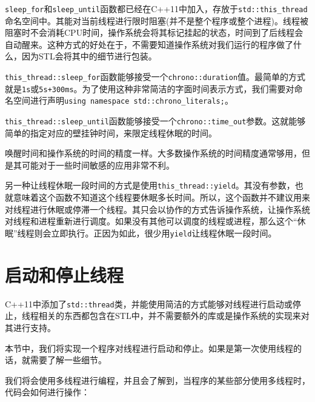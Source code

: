 \texttt{sleep\_for}和\texttt{sleep\_until}函数都已经在C++11中加入，存放于\texttt{std::this\_thread}命名空间中。其能对当前线程进行限时阻塞(并不是整个程序或整个进程)。线程被阻塞时不会消耗CPU时间，操作系统会将其标记挂起的状态，时间到了后线程会自动醒来。这种方式的好处在于，不需要知道操作系统对我们运行的程序做了什么，因为STL会将其中的细节进行包装。

\texttt{this\_thread::sleep\_for}函数能够接受一个\texttt{chrono::duration}值。最简单的方式就是\texttt{1s}或\texttt{5s+300ms}。为了使用这种非常简洁的字面时间表示方式，我们需要对命名空间进行声明\texttt{using namespace std::chrono\_literals;}。

\texttt{this\_thread::sleep\_until}函数能够接受一个\texttt{chrono::time\_out}参数。这就能够简单的指定对应的壁挂钟时间，来限定线程休眠的时间。

唤醒时间和操作系统的时间的精度一样。大多数操作系统的时间精度通常够用，但是其可能对于一些时间敏感的应用非常不利。

另一种让线程休眠一段时间的方式是使用\texttt{this\_thread::yield}。其没有参数，也就意味着这个函数不知道这个线程要休眠多长时间。所以，这个函数并不建议用来对线程进行休眠或停滞一个线程。其只会以协作的方式告诉操作系统，让操作系统对线程和进程重新进行调度。如果没有其他可以调度的线程或进程，那么这个“休眠”线程则会立即执行。正因为如此，很少用\texttt{yield}让线程休眠一段时间。


\section{启动和停止线程}

C++11中添加了\texttt{std::thread}类，并能使用简洁的方式能够对线程进行启动或停止，线程相关的东西都包含在STL中，并不需要额外的库或是操作系统的实现来对其进行支持。

本节中，我们将实现一个程序对线程进行启动和停止。如果是第一次使用线程的话，就需要了解一些细节。


我们将会使用多线程进行编程，并且会了解到，当程序的某些部分使用多线程时，代码会如何进行操作：

